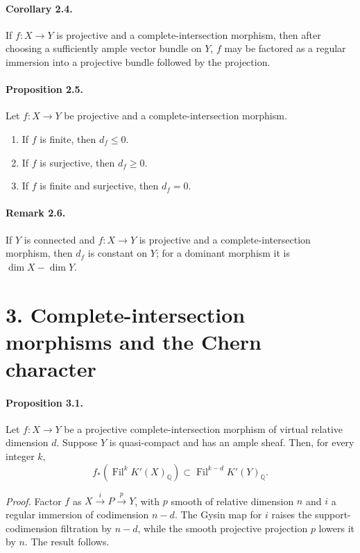 \documentclass[11pt]{article}
\theoremstyle{plain}
\theoremstyle{definition}
\theoremstyle{remark}
\newcommand{\QQ}{\mathbb Q}
\providecommand{\xto}[1]{\xrightarrow{#1}}
\providecommand{\Fil}{\operatorname{Fil}}
\begin{document}
\paragraph{Corollary 2.4.} If $f:X\to Y$ is projective and a complete-intersection morphism, then after choosing a sufficiently ample vector bundle on $Y$, $f$ may be factored as a regular immersion into a projective bundle followed by the projection.

\paragraph{Proposition 2.5.} Let $f:X\to Y$ be projective and a complete-intersection morphism.
\begin{enumerate}[label=\roman*)]
\item If $f$ is finite, then $d_f\leq0$.
\item If $f$ is surjective, then $d_f\geq0$.
\item If $f$ is finite and surjective, then $d_f=0$.
\end{enumerate}

\paragraph{Remark 2.6.} If $Y$ is connected and $f:X\to Y$ is projective and a complete-intersection morphism, then $d_f$ is constant on $Y$; for a dominant morphism it is $\dim X-\dim Y$.

\section*{3. Complete-intersection morphisms and the Chern character}

\paragraph{Proposition 3.1.} Let $f:X\to Y$ be a projective complete-intersection morphism of virtual relative dimension $d$. Suppose $Y$ is quasi-compact and has an ample sheaf. Then, for every integer $k$,
\[
f_*(\Fil^kK'(X)_\QQ)\subset\Fil^{k-d}K'(Y)_\QQ.
\]

\emph{Proof.} Factor $f$ as $X\xto{i}P\xto{p}Y$, with $p$ smooth of relative dimension $n$ and $i$ a regular immersion of codimension $n-d$. The Gysin map for $i$ raises the support-codimension filtration by $n-d$, while the smooth projective projection $p$ lowers it by $n$. The result follows.
\end{document}

